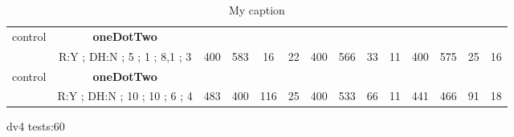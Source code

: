 \begin{table}[]
{\begin{tabular}{|c|c|c|c|c|c|c|c|c|c|c|c|c|c|}
control & \cellcolor{blue!15}\textbf{oneDotTwo}& {\color[HTML]{00009B} } & {\color[HTML]{9A0000} } & {\color[HTML]{009901} } &  & {\color[HTML]{00009B} } & {\color[HTML]{9A0000} } & {\color[HTML]{009901} } &  & {\color[HTML]{00009B} } & {\color[HTML]{9A0000} } & {\color[HTML]{009901} } &  \\ 
 & \cellcolor{ blue!15}R:Y ; DH:N ; 5 ; 1 ; 8,1 ; 3 & \multirow{-2}{*}{{\color[HTML]{00009B} 400}} & \multirow{-2}{*}{{\color[HTML]{9A0000} 583}} & \multirow{-2}{*}{{\color[HTML]{009901} 16}} & \multirow{-2}{*}{22} & \multirow{-2}{*}{{\color[HTML]{00009B} 400}} & \multirow{-2}{*}{{\color[HTML]{9A0000} 566}} & \multirow{-2}{*}{{\color[HTML]{009901} 33}} & \multirow{-2}{*}{11} & \multirow{-2}{*}{{\color[HTML]{00009B} 400}} & \multirow{-2}{*}{{\color[HTML]{9A0000} 575}} & \multirow{-2}{*}{{\color[HTML]{009901} 25}} & \multirow{-2}{*}{16} \\ \hline

control & \cellcolor{blue!15}\textbf{oneDotTwo}& {\color[HTML]{00009B} } & {\color[HTML]{9A0000} } & {\color[HTML]{009901} } &  & {\color[HTML]{00009B} } & {\color[HTML]{9A0000} } & {\color[HTML]{009901} } &  & {\color[HTML]{00009B} } & {\color[HTML]{9A0000} } & {\color[HTML]{009901} } &  \\ 
 & \cellcolor{ blue!15}R:Y ; DH:N ; 10 ; 10 ; 6 ; 4 & \multirow{-2}{*}{{\color[HTML]{00009B} 483}} & \multirow{-2}{*}{{\color[HTML]{9A0000} 400}} & \multirow{-2}{*}{{\color[HTML]{009901} 116}} & \multirow{-2}{*}{25} & \multirow{-2}{*}{{\color[HTML]{00009B} 400}} & \multirow{-2}{*}{{\color[HTML]{9A0000} 533}} & \multirow{-2}{*}{{\color[HTML]{009901} 66}} & \multirow{-2}{*}{11} & \multirow{-2}{*}{{\color[HTML]{00009B} 441}} & \multirow{-2}{*}{{\color[HTML]{9A0000} 466}} & \multirow{-2}{*}{{\color[HTML]{009901} 91}} & \multirow{-2}{*}{18} \\ \hline
\end{tabular}} \caption{ My caption} \label{ my - label} \end{table}


dv4 tests:60

